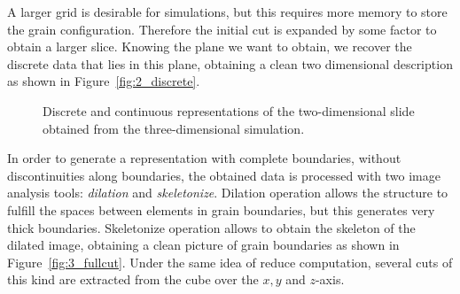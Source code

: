 

A larger grid is desirable for simulations, but this requires more memory to store the grain configuration. 
Therefore the initial cut is expanded by some factor to obtain a larger slice. 
Knowing the plane we want to obtain, we recover the discrete data that lies in this plane, obtaining a clean two dimensional description as shown in Figure~\ref{fig:2_discrete}.

\begin{figure}[t]
    \centering
    \caption{Discrete and continuous representations of the two-dimensional slide obtained from the three-dimensional simulation.}
\end{figure}

In order to generate a representation with complete boundaries, \ie without discontinuities along boundaries, the obtained data is processed with two image analysis tools: \emph{dilation} and \emph{skeletonize}. 
Dilation operation allows the structure to fulfill the spaces between elements in grain boundaries, but this generates very thick boundaries. Skeletonize operation allows to obtain the skeleton of the dilated image, obtaining a clean picture of grain boundaries as shown in Figure~\ref{fig:3_fullcut}. 
Under the same idea of reduce computation, several cuts of this kind are extracted from the cube over the $x, y$ and $z$-axis.


